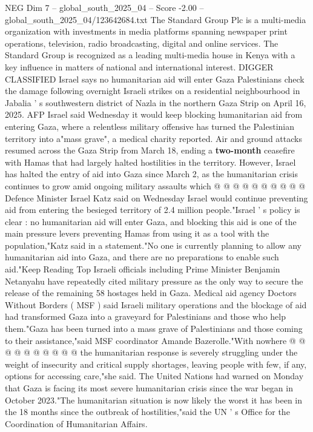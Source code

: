 \begin{textsample}{NEG Dim 7 – global\_south\_2025\_04 – Score -2.00 – global\_south\_2025\_04/123642684.txt}  \label{ex:f7_neg_046}
The Standard Group Plc is a multi-media organization with investments in media platforms spanning newspaper print operations, television, radio broadcasting, digital and online services.
The Standard Group is recognized as a leading multi-media house in Kenya with a key influence in matters of national and international interest.
DIGGER CLASSIFIED Israel says no humanitarian aid will enter Gaza Palestinians check the damage following overnight Israeli strikes on a residential neighbourhood in Jabalia ' s southwestern district of Nazla in the northern Gaza Strip on April 16, 2025.
AFP Israel said Wednesday it would keep blocking humanitarian aid from entering Gaza, where a relentless military offensive has turned the Palestinian territory into a"mass grave", a medical charity reported.
Air and ground attacks resumed across the Gaza Strip from March 18, ending a \textbf{two-month} ceasefire with Hamas that had largely halted hostilities in the territory.
However, Israel has halted the entry of aid into Gaza since March 2, as the humanitarian crisis continues to grow amid ongoing military assaults which @ @ @ @ @ @ @ @ @ @ Defence Minister Israel Katz said on Wednesday Israel would continue preventing aid from entering the besieged territory of 2.4 million people."Israel ' s policy is clear : no humanitarian aid will enter Gaza, and blocking this aid is one of the main pressure levers preventing Hamas from using it as a tool with the population,"Katz said in a statement."No one is currently planning to allow any humanitarian aid into Gaza, and there are no preparations to enable such aid."Keep Reading Top Israeli officials including Prime Minister Benjamin Netanyahu have repeatedly cited military pressure as the only way to secure the release of the remaining 58 hostages held in Gaza.
Medical aid agency Doctors Without Borders ( MSF ) said Israeli military operations and the blockage of aid had transformed Gaza into a graveyard for Palestinians and those who help them."Gaza has been turned into a mass grave of Palestinians and those coming to their assistance,"said MSF coordinator Amande Bazerolle."With nowhere @ @ @ @ @ @ @ @ @ @ the humanitarian response is severely struggling under the weight of insecurity and critical supply shortages, leaving people with few, if any, options for accessing care,"she said.
The United Nations had warned on Monday that Gaza is facing its most severe humanitarian crisis since the war began in October 2023."The humanitarian situation is now likely the worst it has been in the 18 months since the outbreak of hostilities,"said the UN ' s Office for the Coordination of Humanitarian Affairs.

\end{textsample}
